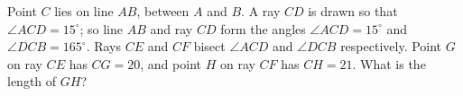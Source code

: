 Point $C$ lies on line $AB$, between $A$ and $B$. A ray $CD$ is drawn so that $\angle ACD=15^\circ$; so line $AB$ and ray $CD$ form the angles $\angle ACD=15^\circ$ and $\angle DCB=165^\circ$. Rays $CE$ and $CF$ bisect $\angle ACD$ and $\angle DCB$ respectively. Point $G$ on ray $CE$ has $CG=20$, and point $H$ on ray $CF$ has $CH=21$. What is the length of $GH$?
